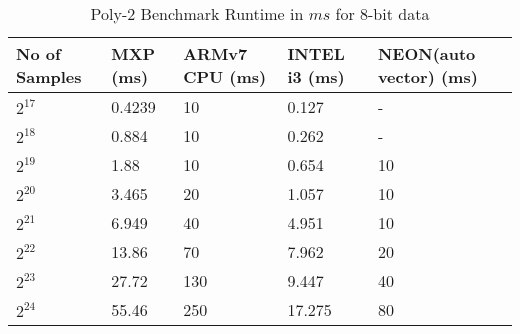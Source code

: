 \begin{table}[htbp]
	\centering
		\begin{adjustbox}{width=.9\textwidth}
		\small
	\begin{tabular}{lllll}
		\toprule
		\textbf{No of Samples} & \textbf{MXP (ms)} & \textbf{ARMv7 CPU (ms)} & \textbf{INTEL i3 (ms)} & \textbf{NEON(auto vector) (ms)} \\
		\midrule
		$2^{17}$ & 0.4239 & 10 & 0.127 & - \\
		$2^{18}$ & 0.884 & 10 & 0.262 & - \\
		$2^{19}$ & 1.88 & 10 & 0.654 & 10 \\
		$2^{20}$ & 3.465 & 20 & 1.057 & 10 \\
		$2^{21}$ & 6.949 & 40 & 4.951 & 10 \\
		$2^{22}$ & 13.86 & 70 & 7.962 & 20 \\
		$2^{23}$ & 27.72 & 130 & 9.447 & 40 \\
		$2^{24}$ & 55.46 & 250 & 17.275 & 80 \\
		\bottomrule
	\end{tabular}%
    \end{adjustbox}%
   \caption{Poly-2 Benchmark Runtime in $ms$ for 8-bit data}
	\label{x:20}%
\end{table}%
